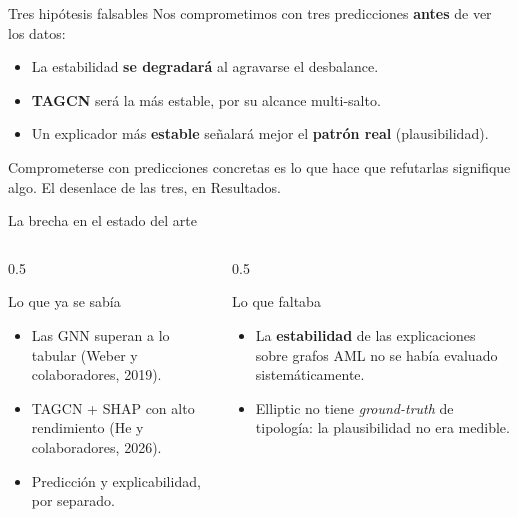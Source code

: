 \documentclass[aspectratio=169,11pt]{beamer}
\begin{document}
\begin{frame}{Tres hipótesis falsables}
Nos comprometimos con tres predicciones \textbf{antes} de ver los datos:
\vspace{0.5em}
\begin{itemize}
  \item[\textcolor{coral}{\textbf{H1}}] La estabilidad \textbf{se degradará} al agravarse el desbalance.
  \item[\textcolor{coral}{\textbf{H2}}] \textbf{TAGCN} será la más estable, por su alcance multi-salto.
  \item[\textcolor{coral}{\textbf{H3}}] Un explicador más \textbf{estable} señalará mejor el \textbf{patrón real} (plausibilidad).
\end{itemize}
\vspace{0.6em}
{\footnotesize\color{muted} Comprometerse con predicciones concretas es lo que hace que refutarlas signifique algo. El desenlace de las tres, en Resultados.}
\end{frame}

\begin{frame}{La brecha en el estado del arte}
\begin{columns}[T]
\begin{column}{0.5\textwidth}
\begin{block}{Lo que ya se sabía}
\begin{itemize}\small
  \item Las GNN superan a lo tabular (Weber y colaboradores, 2019).
  \item TAGCN + SHAP con alto rendimiento (He y colaboradores, 2026).
  \item Predicción y explicabilidad, por separado.
\end{itemize}
\end{block}
\end{column}
\begin{column}{0.5\textwidth}
\begin{alertblock}{Lo que faltaba}
\begin{itemize}\small
  \item La \textbf{estabilidad} de las explicaciones sobre grafos AML no se había evaluado sistemáticamente.
  \item Elliptic no tiene \emph{ground-truth} de tipología: la plausibilidad no era medible.
\end{itemize}
\end{alertblock}
\end{column}
\end{columns}
\end{frame}
\end{document}
